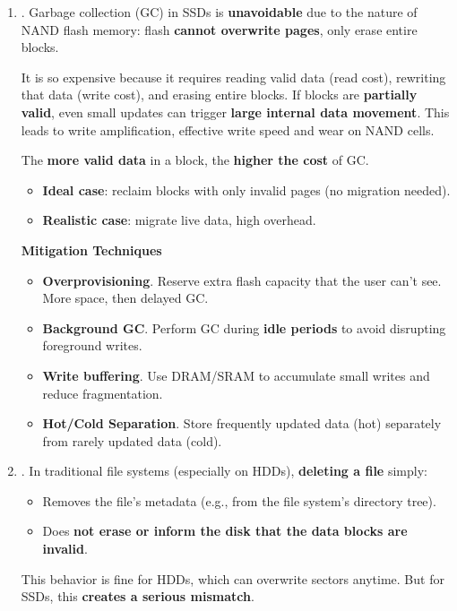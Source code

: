 \begin{enumerate}
    \item {}. Garbage collection (GC) in SSDs is \textbf{unavoidable} due to the nature of NAND flash memory: flash \textbf{cannot overwrite pages}, only erase entire blocks.

    It is so expensive because it requires reading valid data (read cost), rewriting that data (write cost), and erasing entire blocks. If blocks are \textbf{partially valid}, even small updates can trigger \textbf{large internal data movement}. This leads to write amplification, effective write speed and wear on NAND cells.

    The \textbf{more valid data} in a block, the \textbf{higher the cost} of GC.
    \begin{itemize}
        \item \textbf{Ideal case}: reclaim blocks with only invalid pages (no migration needed).
        \item \textbf{Realistic case}: migrate live data, high overhead.
    \end{itemize}

    \textcolor{Green3}{ \textbf{Mitigation Techniques}}
    \begin{itemize}
        \item \textbf{Overprovisioning}. Reserve extra flash capacity that the user can't see. More space, then delayed GC.
        \item \textbf{Background GC}. Perform GC during \textbf{idle periods} to avoid disrupting foreground writes.
        \item \textbf{Write buffering}. Use DRAM/SRAM to accumulate small writes and reduce fragmentation.
        \item \textbf{Hot/Cold Separation}. Store frequently updated data (hot) separately from rarely updated data (cold).
    \end{itemize}
    
    \item {}. In traditional file systems (especially on HDDs), \textbf{deleting a file} simply:
    \begin{itemize}
        \item Removes the file's metadata (e.g., from the file system's directory tree).
        \item Does \textbf{not erase or inform the disk that the data blocks are invalid}.
    \end{itemize}
    This behavior is fine for HDDs, which can overwrite sectors anytime. But for SSDs, this \textbf{creates a serious mismatch}.


\end{enumerate}
